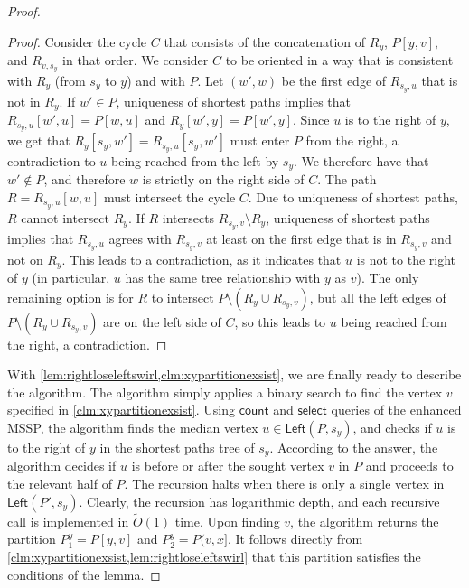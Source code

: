 \documentclass{article}
\newcommand{\Left}{\mathsf{Left}}
\newcommand{\countA}{\mathsf{count}}
\newcommand{\select}{\mathsf{select}}
\newcommand{\Otild}{\tilde{O}}
\begin{document}
\begin{proof}
\begin{proof}
    Consider the cycle $C$ that consists of the concatenation of $R_y$, $P[y,v]$, and $R_{v,s_y}$ in that order.
    We consider $C$ to be oriented in a way that is consistent with $R_y$ (from $s_y$ to $y$) and with $P$.
    Let $(w',w)$ be the first edge of $R_{s_y,u}$ that is not in $R_y$.
    If $w' \in P$, uniqueness of shortest paths implies that $R_{s_y,u}[w',u]=P[w,u]$ and $R_y[w',y]=P[w',y]$.
    Since $u$ is to the right of $y$, we get that $R_y[s_y,w'] = R_{s_y,u}[s_y,w']$ must enter $P$ from the right, a contradiction to $u$ being reached from the left by $s_y$.
    We therefore have that $w' \notin P$, and therefore $w$ is strictly on the right side of $C$.
    The path $R=R_{s_y,u}[w,u]$ must intersect the cycle $C$.
    Due to uniqueness of shortest paths, $R$ cannot intersect $R_y$.
    If $R$ intersects $R_{s_y,v} \setminus R_y$, uniqueness of shortest paths implies that $R_{s_y,u}$ agrees with $R_{s_y,v}$ at least on the first edge that is in $R_{s_y,v}$ and not on $R_y$.
    This leads to a contradiction, as it indicates that $u$ is not to the right of $y$ (in particular, $u$ has the same tree relationship with $y$ as $v$).
    The only remaining option is for $R$ to intersect $P \setminus (R_y \cup R_{s_y,v})$, but all the left edges of $P \setminus (R_y \cup R_{s_y,v})$ are on the left side of $C$, so this leads to $u$ being reached from the right, a contradiction.
\end{proof}

With \cref{lem:rightloseleftswirl,clm:xypartitionexsist}, we are finally ready to describe the algorithm.
The algorithm simply applies a binary search to find the vertex $v$ specified in \cref{clm:xypartitionexsist}.
Using $\countA$ and $\select$ queries of the enhanced MSSP, the algorithm finds the median vertex $u\in \Left(P,s_y)$, and checks if $u$ is to the right of $y$ in the shortest paths tree of $s_y$.
According to the answer, the algorithm decides if $u$ is before or after the sought vertex $v$ in $P$ and proceeds to the relevant half of $P$.
The recursion halts when there is only a single vertex in $\Left(P',s_y)$.
Clearly, the recursion has logarithmic depth, and each recursive call is implemented in $\Otild(1)$ time.
Upon finding $v$, the algorithm returns the partition $P^y_1 = P[y,v]$ and $P^y_2=P(v,x]$.
It follows directly from \cref{clm:xypartitionexsist,lem:rightloseleftswirl} that this partition satisfies the conditions of the lemma.
\end{proof}
\end{document}

